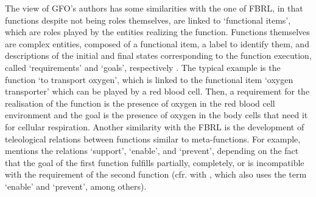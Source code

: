 \documentclass[sw]{iosart2x}
\newcommand{\GFO}{\textsc{GFO}\xspace}
\begin{document}
The view of \GFO's authors has some similarities with the one of FBRL, in that functions despite not being roles themselves, are linked to `functional items', which are roles played by the entities realizing the function. Functions themselves are complex entities, composed of a functional item, a label to identify them, and descriptions of the initial and final states corresponding to the function execution, called `requirements' and `goals', respectively \cite{burekToplevelOntologyFunctions2006,burekOverviewGFOFunctions2021}. The typical example is the function `to transport oxygen', which is linked to the functional item `oxygen transporter' which can be played by a red blood cell. Then, a requirement for the realisation of the function is the presence of oxygen in the red blood cell environment and the goal is the presence of oxygen in the body cells that need it for cellular respiration. Another similarity with the FBRL is the development of teleological relations between functions similar to meta-functions. For example, \cite{burekToplevelOntologyFunctions2006} mentions the relations `support', `enable', and `prevent', depending on the fact that the goal of the first function fulfills partially, completely, or is incompatible with the requirement of the second function (cfr. with \cite{kitamuraMetaFunctionsArtifacts1999}, which also uses the term `enable' and `prevent', among others). 
\end{document}
